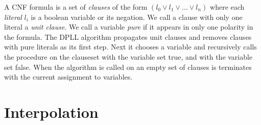 A CNF formula is a set of \emph{clauses} of the form $(l_0 \lor l_1 \lor ...
\lor l_n)$ where each \emph{literal} $l_i$ is a boolean variable or its
negation. We call a clause with only one literal a \emph{unit clause}. We call
a variable \emph{pure} if it appears in only one polarity in the formula. The
DPLL algorithm propagates unit clauses and removes clauses with pure literals
as its first step. Next it chooses a variable and recursively calls the
procedure on the clauseset with the variable set true, and with the variable
set false. When the algorithm is called on an empty set of clauses is
terminates with the current assignment to variables. 

\section{Interpolation}
